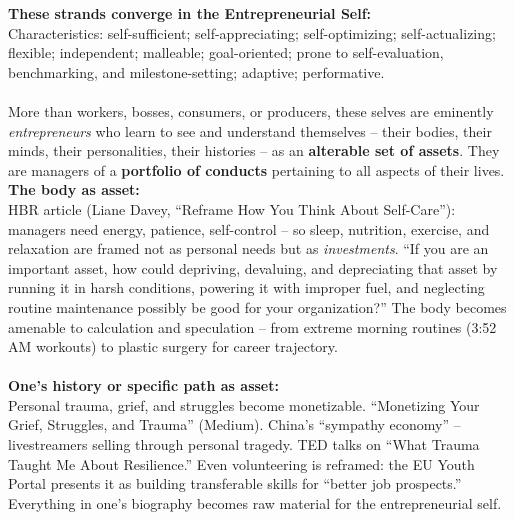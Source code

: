 \documentclass[a4paper,12pt]{article}
\begin{document}
\noindent \textbf{These strands converge in the Entrepreneurial Self:} \\
\noindent Characteristics: self-sufficient; self-appreciating; self-optimizing; self-actualizing; flexible; independent; malleable; goal-oriented; prone to self-evaluation, benchmarking, and milestone-setting; adaptive; performative. \\
\\
\noindent More than workers, bosses, consumers, or producers, these selves are eminently \emph{entrepreneurs} who learn to see and understand themselves -- their bodies, their minds, their personalities, their histories -- as an \textbf{alterable set of assets}. They are managers of a \textbf{portfolio of conducts} pertaining to all aspects of their lives. \\

\noindent \textbf{The body as asset:} \\
\noindent HBR article (Liane Davey, ``Reframe How You Think About Self-Care''): managers need energy, patience, self-control -- so sleep, nutrition, exercise, and relaxation are framed not as personal needs but as \emph{investments}. ``If you are an important asset, how could depriving, devaluing, and depreciating that asset by running it in harsh conditions, powering it with improper fuel, and neglecting routine maintenance possibly be good for your organization?'' The body becomes amenable to calculation and speculation -- from extreme morning routines (3:52 AM workouts) to plastic surgery for career trajectory. \\
\\
\noindent \textbf{One's history or specific path as asset:} \\
\noindent Personal trauma, grief, and struggles become monetizable. ``Monetizing Your Grief, Struggles, and Trauma'' (Medium). China's ``sympathy economy'' -- livestreamers selling through personal tragedy. TED talks on ``What Trauma Taught Me About Resilience.'' Even volunteering is reframed: the EU Youth Portal presents it as building transferable skills for ``better job prospects.'' Everything in one's biography becomes raw material for the entrepreneurial self. \\
\end{document}
